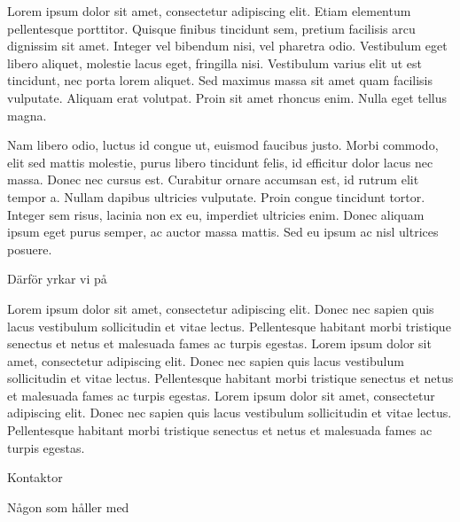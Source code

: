 \documentclass[../main/handlingar.tex]{subfiles}
\begin{document}

Lorem ipsum dolor sit amet, consectetur adipiscing elit. Etiam elementum pellentesque porttitor. Quisque finibus tincidunt sem, pretium facilisis arcu dignissim sit amet. Integer vel bibendum nisi, vel pharetra odio. Vestibulum eget libero aliquet, molestie lacus eget, fringilla nisi. Vestibulum varius elit ut est tincidunt, nec porta lorem aliquet. Sed maximus massa sit amet quam facilisis vulputate. Aliquam erat volutpat. Proin sit amet rhoncus enim. Nulla eget tellus magna.

Nam libero odio, luctus id congue ut, euismod faucibus justo. Morbi commodo, elit sed mattis molestie, purus libero tincidunt felis, id efficitur dolor lacus nec massa. Donec nec cursus est. Curabitur ornare accumsan est, id rutrum elit tempor a. Nullam dapibus ultricies vulputate. Proin congue tincidunt tortor. Integer sem risus, lacinia non ex eu, imperdiet ultricies enim. Donec aliquam ipsum eget purus semper, ac auctor massa mattis. Sed eu ipsum ac nisl ultrices posuere.

Därför yrkar vi på
\begin{attsatser}
    \att Lorem ipsum dolor sit amet, consectetur adipiscing elit. Donec nec sapien quis lacus vestibulum sollicitudin et vitae lectus. Pellentesque habitant morbi tristique senectus et netus et malesuada fames ac turpis egestas.
    \att Lorem ipsum dolor sit amet, consectetur adipiscing elit. Donec nec sapien quis lacus vestibulum sollicitudin et vitae lectus. Pellentesque habitant morbi tristique senectus et netus et malesuada fames ac turpis egestas.
    \att Lorem ipsum dolor sit amet, consectetur adipiscing elit. Donec nec sapien quis lacus vestibulum sollicitudin et vitae lectus. Pellentesque habitant morbi tristique senectus et netus et malesuada fames ac turpis egestas.
\end{attsatser}

\begin{signatures}{2}
    \mvh
    \signature{Erik Månsson}{Kontaktor}
    \signature{Måns Eriksson}{Någon som håller med}
\end{signatures}
\end{document}
